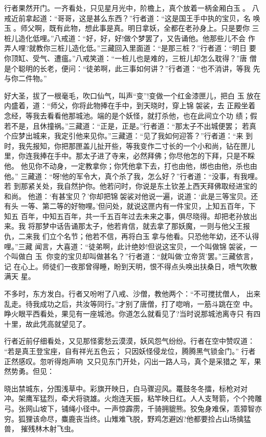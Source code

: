 行者果然开门。一齐看处，只见星月光中，阶檐上，真个放着一柄金厢白玉。
八戒近前拿起道：“哥哥，这是甚么东西？”行者道：“这是国王手中执的宝贝，名
唤玉。师父啊，既有此物，想此事是真。明日拿妖，全都在老孙身上。只是要你
三桩儿造化低哩。”八戒道：“好，好，好!做个梦罢了，又告诵他。他那些儿不会
作弄人哩?就教你三桩儿造化低。”三藏回入里面道：“是那三桩？”行者道：“明日
要你顶缸、受气、遭瘟。”八戒笑道：“一桩儿也是难的，三桩儿却怎么耽得？”唐
僧是个聪明的长老，便问：“徒弟啊，此三事如何讲？”行者道：“也不消讲，等我
先与你二件物。”

好大圣，拔了一根毫毛，吹口仙气，叫声“变”!变做一个红金漆匣儿，把白
玉放在内盛着，道：“师父，你将此物捧在手中，到天晓时，穿上锦袈裟，去
正殿坐着念经，等我去看看他那城池。端的是个妖怪，就打杀他，也在此间立个功
绩；假若不是，且休撞祸。”三藏道：“正是，正是。”行者道：“那太子不出城便罢；
若真个应梦出城来，我定引他来见你。”三藏道：“见了我如何迎答？”行者道：“来
到时，我先报知，你把那匣盖儿扯开些，等我变作二寸长的一个小和尚，钻在匣儿
里，你连我捧在手中。那太子进了寺来，必然拜佛；你尽他怎的下拜，只是不睬他。
他见你不动身，一定教拿你；你凭他拿下去，打也由他，绑也由他，杀也由他。”
三藏道：“呀!他的军令大，真个杀了我，怎么好？”行者道：“没事，有我哩。若
到那紧关处，我自然护你。他若问时，你说是东土钦差上西天拜佛取经进宝的和尚。
他道：‘有甚宝贝？’你却把锦袈裟对他说一遍，说道：‘此是三等宝贝。还有头
一等、第二等的好物哩。’但问处，就说这匣内有一件宝贝，上知五百年，下知五
百年，中知五百年，共一千五百年过去未来之事，俱尽晓得。却把老孙放出来。我
将那梦中话告诵那太子，他若肯信，就去拿了那妖魔，一则与他父王报仇，二来我
们立个名节；他若不信，再将白玉拿与他看。只恐他年幼，还不认得哩。”三藏
闻言，大喜道：“徒弟啊，此计绝妙!但说这宝贝，一个叫做锦袈裟，一个叫做白
玉；你变的宝贝却叫做甚名？”行者道：“就叫做‘立帝货’罢。”三藏依言，记
在心上。师徒们一夜那曾得睡，盼到天明，恨不得点头唤出扶桑日，喷气吹散满天
星。

不多时，东方发白。行者又吩咐了八戒、沙僧，教他两个：“不可搅扰僧人，
出来乱走。待我成功之后，共汝等同行。”才别了唐僧，打了唿哨，一筋斗跳在空
中。睁火眼平西看处，果见有一座城池。你道怎么就看见了?当时说那城池离寺只
有四十里，故此凭高就望见了。

行者近前仔细看处，又见那怪雾愁云漠漠，妖风怨气纷纷。行者在空中赞叹道：
“若是真王登宝座，自有祥光五色云；
只因妖怪侵龙位，腾腾黑气锁金门。”
行者正然感叹。忽听得炮声响，又只见东门开处，闪出一路人马，真个是采猎之
军，果然势勇。但见：

晓出禁城东，分围浅草中。彩旗开映日，白马骤迎风。鼍鼓冬冬擂，标枪对对
冲。架鹰军猛烈，牵犬将骁雄。火炮连天振，粘竿映日红。人人支弩箭，个个挎雕
弓。张网山坡下，铺绳小径中。一声惊霹雳，千骑拥貔熊。狡兔身难保，乖獐智亦
穷。狐狸该命尽，麋鹿丧当终。山雉难飞脱，野鸡怎避凶?他都要捡占山场擒猛兽，
摧残林木射飞虫。

